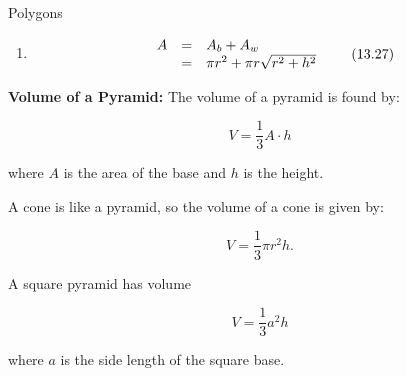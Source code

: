 \begin{exercises}{Polygons}
{\begin{mdframed}[linewidth=4, leftmargin=40, rightmargin=40]
\begin{exercise}
\begin{enumerate}[noitemsep, label=\textbf{Step} \textbf{\arabic*}. ]
      
      \item  
      \label{m39357*id63035}\nopagebreak\noindent{}
        
    \begin{equation}
    \begin{array}{ccc}\hfill A& =& {A}_{b}+{A}_{w}\hfill \\ & =& \pi {r}^{2}+\pi r\sqrt{{r}^{2}+{h}^{2}}\hfill \end{array}\tag{13.27}
      \end{equation}
    
      
      
      \end{enumerate}
         

    \end{exercise}
    \end{mdframed}
    }
    \noindent
  
      \label{m39357*id63137}\textbf{Volume of a Pyramid:} The volume of a pyramid is found by:\par 
      \label{m39357*id63144}\nopagebreak\noindent{}
        
    \begin{equation}
    V=\frac{1}{3}A\ensuremath{\cdot}h\tag{13.28}
      \end{equation}
    
      
      \label{m39357*id63170}where $A$ is the area of the base and $h$ is the height.\par 
      \label{m39357*id63191}A cone is like a pyramid, so the volume of a cone is given by:\par 
      \label{m39357*id63195}\nopagebreak\noindent{}
        
    \begin{equation}
    V=\frac{1}{3}\pi {r}^{2}h.\tag{13.29}
      \end{equation}
    
      
      \label{m39357*id62104}A square pyramid has volume\par 
      \label{m39357*id62107}\nopagebreak\noindent{}
        
    \begin{equation}
    V=\frac{1}{3}{a}^{2}h\tag{13.30}
      \end{equation}
    
      
      \label{m39357*id63440}where $a$ is the side length of the square base.\par 
\label{m39357*secfhsst!!!underscore!!!id330}\vspace{.5cm} 
      

\end{exercises}
